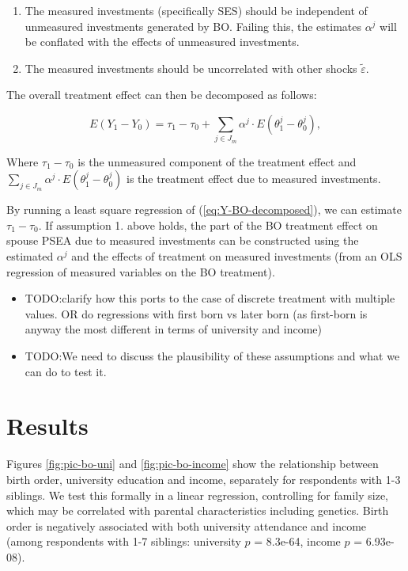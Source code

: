 \documentclass[
]{article}
\providecommand{\tightlist}{%
  \setlength{\itemsep}{0pt}\setlength{\parskip}{0pt}}
\begin{document}
\begin{enumerate}
\def\labelenumi{\arabic{enumi}.}
\item
  The measured investments (specifically SES) should be independent of
  unmeasured investments generated by BO. Failing this, the estimates
  \(\alpha^j\) will be conflated with the effects of unmeasured
  investments.
\item
  The measured investments should be uncorrelated with other shocks
  \(\tilde{\varepsilon}\).
\end{enumerate}

The overall treatment effect can then be decomposed as follows:

\begin{equation}
E(Y_1-Y_0)=\tau_1-\tau_0 + \sum_{j\in J_m} \alpha^j \cdot E(\theta_1^j-\theta_0^j),  \tag{6}
\end{equation}

Where \(\tau_1 - \tau_0\) is the unmeasured component of the treatment
effect and \(\sum_{j\in J_m} \alpha^j \cdot E(\theta_1^j-\theta_0^j)\) is
the treatment effect due to measured investments.

By running a least square regression of (\ref{eq:Y-BO-decomposed}), we
can estimate \(\tau_1-\tau_0\). If assumption 1. above holds, the part of
the BO treatment effect on spouse PSEA due to measured investments can
be constructed using the estimated \(\alpha^j\) and the effects of
treatment on measured investments (from an OLS regression of measured
variables on the BO treatment).

\begin{itemize}
\tightlist
\item
  TODO:clarify how this ports to the case of discrete treatment with
  multiple values. OR do regressions with first born vs later born (as
  first-born is anyway the most different in terms of university and
  income)
\item
  TODO:We need to discuss the plausibility of these assumptions and
  what we can do to test it.
\end{itemize}

\hypertarget{results}{%
\section{Results}\label{results}}

Figures \ref{fig:pic-bo-uni} and \ref{fig:pic-bo-income} show the
relationship between birth order, university education and income,
separately for respondents with 1-3 siblings. We test this formally in a
linear regression, controlling for family size, which may be correlated
with parental characteristics including genetics. Birth order is
negatively associated with both university attendance and income (among
respondents with 1-7 siblings: university \(p\) = 8.3e-64,
income \(p\) = 6.93e-08).
\end{document}
